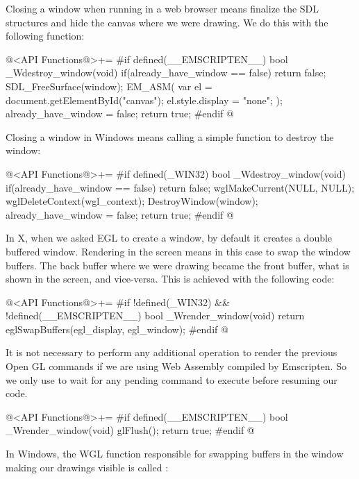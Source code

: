 
Closing a window when running in a web browser means finalize the SDL
structures and hide the canvas where we were drawing. We do this with
the following function:

\iniciocodigo
@<API Functions@>+=
#if defined(__EMSCRIPTEN__)
bool _Wdestroy_window(void){
  if(already_have_window == false)
    return false;
  SDL_FreeSurface(window);
  EM_ASM(
    var el = document.getElementById("canvas");
    el.style.display = "none";
  );
  already_have_window = false;
  return true;
}
#endif
@
\fimcodigo


Closing a window in Windows means calling a simple function to destroy
the window:

\iniciocodigo
@<API Functions@>+=
#if defined(_WIN32)
bool _Wdestroy_window(void){
  if(already_have_window == false)
    return false;
  wglMakeCurrent(NULL, NULL);
  wglDeleteContext(wgl_context);
  DestroyWindow(window);
  already_have_window = false;
  return true;
}
#endif
@
\fimcodigo


In X, when we asked EGL to create a window, by default it creates a
double buffered window. Rendering in the screen means in this case to
swap the window buffers. The back buffer where we were drawing became
the front buffer, what is shown in the screen, and vice-versa. This is
achieved with the following code:

\iniciocodigo
@<API Functions@>+=
#if !defined(_WIN32) && !defined(__EMSCRIPTEN__)
bool _Wrender_window(void){
  return eglSwapBuffers(egl_display, egl_window);
}
#endif
@
\fimcodigo


It is not necessary to perform any additional operation to render the
previous Open GL commands if we are using Web Assembly compiled by
Emscripten. So we only use  to wait for any
pending command to execute before resuming our code.

\iniciocodigo
@<API Functions@>+=
#if defined(__EMSCRIPTEN__)
bool _Wrender_window(void){
  glFlush();
  return true;
}
#endif
@
\fimcodigo


In Windows, the WGL function responsible for swapping buffers in the
window making our drawings visible is
called :

